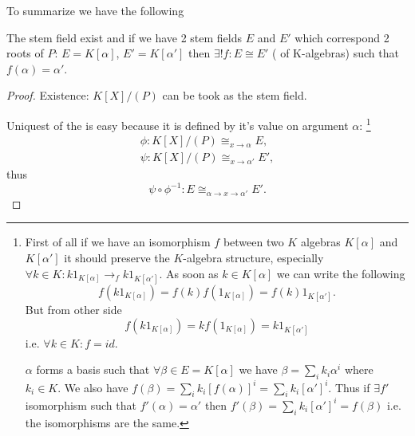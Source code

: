 To summarize we have the following
\begin{proposition}
  The stem field exist and if we have 2 stem fields $E$ and $E'$ which
  correspond 2 roots of $P$: $E = K\left[\alpha\right]$,
  $E' = K\left[\alpha'\right]$ then $\exists! f: E \cong E'$
  ( of K-algebras) such that $f(\alpha) =
  \alpha'$. 
  \begin{proof}
    Existence: $K\left[X\right]/\left(P\right)$ can be took as the
    stem field.

    Uniquest of the  is easy because it is
    defined by it's value on argument $\alpha$:
    \footnote{
      \label{note:stemfieldisomorphismunique}
      First of all if we have an isomorphism $f$ between two $K$
      algebras $K\left[\alpha \right]$ and $K\left[\alpha'
        \right]$ it should preserve the $K$-algebra structure,
      especially $\forall k \in K: k 1_{K\left[\alpha \right]} \to_f
      k 1_{K\left[\alpha' \right]}$. As soon as \(k \in K\left[
        \alpha \right]\) we can write the following
      \[
      f\left(k
      1_{K\left[\alpha \right]}\right) = f\left(k\right)
      f\left(1_{K\left[\alpha \right]}\right) = f\left(k\right)
      1_{K\left[\alpha' \right]}.
      \]
      But from other side
      \[
      f\left(k
      1_{K\left[\alpha \right]}\right) = k f\left(1_{K\left[\alpha
          \right]}\right) = k 1_{K\left[\alpha' \right]}
      \]
      i.e. \(\forall k \in K: f = id\). 

      $\alpha$ forms a basis such that $\forall \beta \in E =
      K\left[\alpha\right]$ we have $\beta = \sum_i k_i \alpha^i$
      where $k_i \in K$. We also have $f\left( \beta \right) =
      \sum_i k_i \left[f \left( \alpha\right)\right]^i = \sum_i k_i
      \left[\alpha'\right]^i$. Thus if $\exists f'$ isomorphism such
      that $f'\left(\alpha \right) = \alpha'$ then $f'\left( \beta
      \right) = \sum_i k_i \left[\alpha'\right]^i =
      f \left( \beta\right)$
      i.e. the isomorphisms are the same. 
    }
    \begin{eqnarray}
      \phi: K\left[X\right]/\left(P\right) \cong_{x \to \alpha} E,
      \nonumber \\
      \psi: K\left[X\right]/\left(P\right) \cong_{x \to \alpha'} E',
      \nonumber
    \end{eqnarray}
    thus
    \[
    \psi \circ \phi^{-1} : E \cong_{\alpha \to x \to \alpha'} E'.
    \]
  \end{proof}
  \label{prop:stemfield}
\end{proposition}

